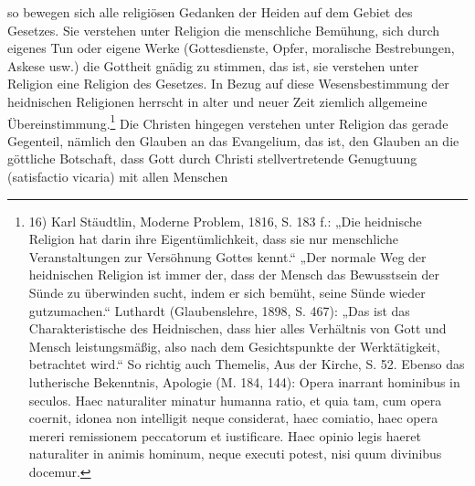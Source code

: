 so bewegen sich alle religiösen Gedanken der Heiden auf dem Gebiet des Gesetzes. Sie verstehen unter Religion die menschliche Bemühung, sich durch eigenes Tun oder eigene Werke (Gottesdienste, Opfer, moralische Bestrebungen, Askese usw.) die Gottheit gnädig zu stimmen, das ist, sie verstehen unter Religion eine Religion des Gesetzes. In Bezug auf diese Wesensbestimmung der heidnischen Religionen herrscht in alter und neuer Zeit ziemlich allgemeine Übereinstimmung.\footnote{16) Karl Stäudtlin, Moderne Problem, 1816, S. 183 f.: „Die heidnische Religion hat darin ihre Eigentümlichkeit, dass sie nur menschliche Veranstaltungen zur Versöhnung Gottes kennt.“ „Der normale Weg der heidnischen Religion ist immer der, dass der Mensch das Bewusstsein der Sünde zu überwinden sucht, indem er sich bemüht, seine Sünde wieder gutzumachen.“ Luthardt (Glaubenslehre, 1898, S. 467): „Das ist das Charakteristische des Heidnischen, dass hier alles Verhältnis von Gott und Mensch leistungsmäßig, also nach dem Gesichtspunkte der Werktätigkeit, betrachtet wird.“ So richtig auch Themelis, Aus der Kirche, S. 52. Ebenso das lutherische Bekenntnis, Apologie (M. 184, 144): Opera inarrant hominibus in seculos. Haec naturaliter minatur humanna ratio, et quia tam, cum opera coernit, idonea non intelligit neque considerat, haec comiatio, haec opera mereri remissionem peccatorum et iustificare. Haec opinio legis haeret naturaliter in animis hominum, neque executi potest, nisi quum divinibus docemur.}
Die Christen hingegen verstehen unter Religion das gerade Gegenteil, nämlich den Glauben an das Evangelium, das ist, den Glauben an die göttliche Botschaft, dass Gott durch Christi stellvertretende Genugtuung (satisfactio vicaria) mit allen Menschen